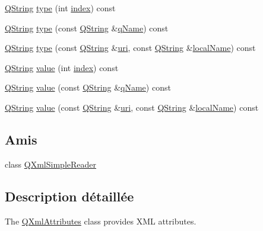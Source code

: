 \begin{DoxyCompactItemize}
\item 
\hyperlink{class_q_string}{Q\+String} \hyperlink{class_q_xml_attributes_aafad06b6b481fe8c64c892d185988ec6}{type} (int \hyperlink{class_q_xml_attributes_a542da36bc124fbee3cbc48f555c02c19}{index}) const 
\item 
\hyperlink{class_q_string}{Q\+String} \hyperlink{class_q_xml_attributes_ad8511105f792a84c612b07490e6a25b1}{type} (const \hyperlink{class_q_string}{Q\+String} \&\hyperlink{class_q_xml_attributes_a1cb2a771348a023deb7d90c901aafe6c}{q\+Name}) const 
\item 
\hyperlink{class_q_string}{Q\+String} \hyperlink{class_q_xml_attributes_a25ec58fc3c1fc56eee28edebf5e976a5}{type} (const \hyperlink{class_q_string}{Q\+String} \&\hyperlink{class_q_xml_attributes_a5653460e735986eeab8ae7992cc9158b}{uri}, const \hyperlink{class_q_string}{Q\+String} \&\hyperlink{class_q_xml_attributes_ace9a01af51817fdfbd76cebe3b83f185}{local\+Name}) const 
\item 
\hyperlink{class_q_string}{Q\+String} \hyperlink{class_q_xml_attributes_a01f6a61b11593a4591a4508a426fe297}{value} (int \hyperlink{class_q_xml_attributes_a542da36bc124fbee3cbc48f555c02c19}{index}) const 
\item 
\hyperlink{class_q_string}{Q\+String} \hyperlink{class_q_xml_attributes_aec9868f216ca3278b76c219fa05f49e1}{value} (const \hyperlink{class_q_string}{Q\+String} \&\hyperlink{class_q_xml_attributes_a1cb2a771348a023deb7d90c901aafe6c}{q\+Name}) const 
\item 
\hyperlink{class_q_string}{Q\+String} \hyperlink{class_q_xml_attributes_a1f096ed3aea3e961d90300b7a288d8d1}{value} (const \hyperlink{class_q_string}{Q\+String} \&\hyperlink{class_q_xml_attributes_a5653460e735986eeab8ae7992cc9158b}{uri}, const \hyperlink{class_q_string}{Q\+String} \&\hyperlink{class_q_xml_attributes_ace9a01af51817fdfbd76cebe3b83f185}{local\+Name}) const 
\end{DoxyCompactItemize}
\subsection*{Amis}
\begin{DoxyCompactItemize}
\item 
class \hyperlink{class_q_xml_attributes_aba6d8e1fe7917a5056b07bf8d4b4e53c}{Q\+Xml\+Simple\+Reader}
\end{DoxyCompactItemize}


\subsection{Description détaillée}
The \hyperlink{class_q_xml_attributes}{Q\+Xml\+Attributes} class provides X\+M\+L attributes. 

